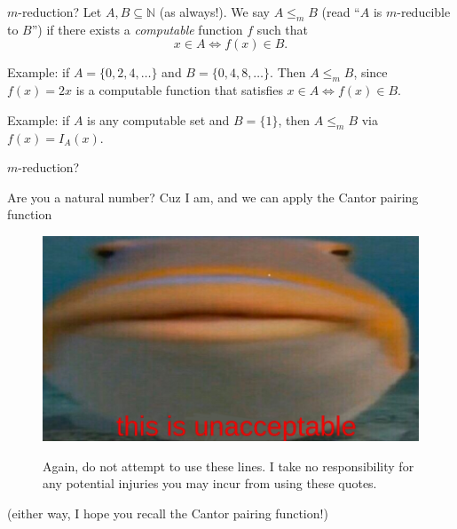 \documentclass{beamer}
\begin{document}
\begin{frame}{$m$-reduction? \emojiflushed}
Let $A, B \subseteq \mathbb N$ (as always!). We say $A \leq_m B$ (read ``$A$ is $m$-reducible to $B$'') if there exists a \textit{computable} function $f$ such that
$$x \in A \Leftrightarrow f(x) \in B.$$ 

Example: if $A = \{0, 2, 4, \ldots\}$ and $B = \{0, 4, 8, \ldots\}$. Then $A \leq_m B$, since $f(x) = 2x$ is a computable function that satisfies $x \in A \Leftrightarrow f(x) \in B$.

\vspace{2mm}

Example: if $A$ is any computable set and $B = \{1\}$, then $A \leq_m B$ via $f(x) = I_A(x)$.

\end{frame}

\begin{frame}{$m$-reduction? \emojiflushed}

{\color{red} Are you a natural number? Cuz I am, and we can apply the Cantor pairing function \emojiflushed \emojisushi}

\begin{figure}[h]
\centering
\includegraphics[scale=0.2]{img/helo_fish_unacceptable.jpg}

Again, do not attempt to use these lines. I take no responsibility for any potential injuries you may incur from using these quotes.
\end{figure}

(either way, I hope you recall the Cantor pairing function!)

\end{frame}
\end{document}
